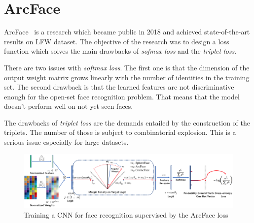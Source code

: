 \chapter{ArcFace}\label{ch:arcface}
ArcFace~\cite{ArcFace} is a research which became public in 2018 and achieved state-of-the-art results on LFW dataset.
The objective of the research was to design a loss function which solves the main drawbacks of \textit{sofmax loss}
and the \textit{triplet loss}.

There are two issues with \textit{softmax loss}.
The first one is that the dimension of the output weight matrix grows linearly with the number of identities in the
training set.
The second drawback is that the learned features are not discriminative enough for the open-set face recognition
problem.
That means that the model doesn't perform well on not yet seen faces.

The drawbacks of \textit{triplet loss} are the demands entailed by the construction of the triplets.
The number of those is subject to combinatorial explosion.
This is a serious issue especially for large datasets.


\begin{figure}[H]
    \centering
    \includegraphics[width=\columnwidth]{images/arcface/arcface.png}
    \caption{Training a CNN for face recognition supervised by the ArcFace loss~\cite{ArcFace}}
    \label{fig:arcface}
\end{figure}